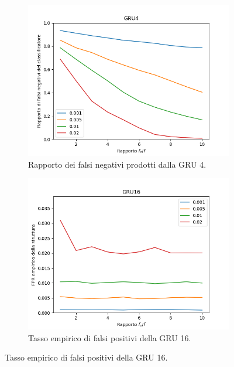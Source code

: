 \documentclass[../../main.tex]{subfiles}
\begin{document}
\begin{figure}[H]
\begin{subfigure}[b]{0.32\textwidth}
        \end{subfigure}
        \begin{subfigure}[b]{0.32\textwidth}
            \centering
            \includegraphics[width = \textwidth]{immagini/7/SLBF/GRU4_FNR.png}
            \caption{Rapporto dei falsi negativi prodotti dalla GRU 4.}
            \label{fig:SLBFFNR_GRU4}
        \end{subfigure}
        \begin{subfigure}[b]{0.32\textwidth}
            \centering
            \includegraphics[width = \textwidth]{immagini/7/SLBF/GRU16_FPR.png}
            \caption{Tasso empirico di falsi positivi della GRU 16.}
            \label{fig:SLBFFPR_GRU16}
        \end{subfigure}

\end{figure}
\end{document}
